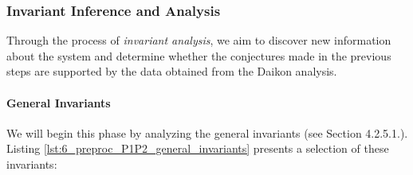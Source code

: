 \begin{comment}
		C25 & There is a correlation between the trend of \texttt{P1\_P101} and the trend of \texttt{P2\_MV201}. & Observation derived from the plot\\ 
		\hline
		
		C26 & \texttt{P2\_MV201} is responsible for \textbf{filling a tank} that is \textit{not} part of this subsystem. & Sensors \texttt{P2\_AIT202} and \texttt{P2\_AIT203} do not exhibit an increasing trend when the valve is ON, and there is no apparent correspondence between the trend of the valve and the trend of \texttt{P1\_LIT101}.\\ 
		\hline
		
		C27 & \texttt{P2\_AIT201} is a sensor that measures \textbf{some property of the water}. & Measurement does not show a cyclic pattern in its measurements.\\
		\hline
		
		C28 & \texttt{P2\_AIT202} is a sensor that measures \textbf{some property of the water}. & Very narrow range between maximum and minimum values (point 4 of the third premise in Section \ref{par:6_conventions})\\
		\hline
		
		C29 & The trend of \texttt{P2\_AIT202} and \texttt{P2\_AIT203} follows the trend of \texttt{P2\_P20x} pumps & Observation derived from the plot\\ 
		\hline
		
	\caption{}
	\label{table:6_P1P2_summarize_graphs}
	\end{longtable}
}
\end{comment}
		
\subsubsection{Invariant Inference and Analysis}
\label{subsubsec:6_P1P2_invariants}
Through the process of \textit{invariant analysis}, we aim to discover new information about the system and determine whether the conjectures made in the previous steps are supported by the data obtained from the Daikon analysis.

\paragraph{General Invariants}
We will begin this phase by analyzing the general invariants (see Section 4.2.5.1.). Listing \ref{lst:6_preproc_P1P2_general_invariants} presents a selection of these invariants:

